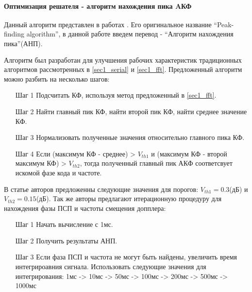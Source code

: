 \paragraph{Оптимизация решателя - алгоритм нахождения пика AКФ}

Данный алгоритм представлен в работах \cite{2max_ieee, 2max_article}. Его оригинальное название
\textquotedblleft{Peak-finding algorithm}\textquotedblright,
в данной работе введем перевод -
\textquotedblleft{Алгоритм нахождения пика}\textquotedblright (АНП). 

Алгоритм был разработан для улучшения рабочих характеристик традиционных алгоритмов рассмотренных в
\ref{sec1_serial} и \ref{sec1_fft}. Предложенный алгоритм можно разбить на несколько шагов:
\begin{itemize}
\item[Шаг 1] Подсчитать КФ, используя метод предложенный в \ref{sec1_fft}.
\item[Шаг 2] Найти главный пик КФ, найти второй пик КФ, найти среднее значение КФ.
\item[Шаг 3] Нормализовать полученные значения относительно главного пика КФ.
\item[Шаг 4] Если (максимум КФ - среднее) > ${V_{th1}}$ и (максимум КФ - 
	второй максимум КФ) > ${V_{th2}}$, тогда полученный главный пик АКФ соответсвует
	искомой фазе кода и частоте.
\end{itemize}

В статье авторов \cite{2max_ieee} предложенны следующие значения для порогов:
${V_{th1}} = 0.3$(дБ) и  ${V_{th2}} = 0.15$(дБ). Так же авторы предлагают итерационную процедуру для нахождения
фазы ПСП и частоты смещения допплера:
\begin{itemize}
\item[Шаг 1] Начать вычисление с 1мс.
\item[Шаг 2] Получить результаты АНП.
\item[Шаг 3] Если фаза ПСП и частота не могут быть найдены, увеличить время интегрироавния сигнала.
	Использовать следующие значения для интегрирования: 1мс -> 10мс -> 50мс -> 100мс -> 200мс ->
	500мс -> 1000мс
\end{itemize}



\newpage
